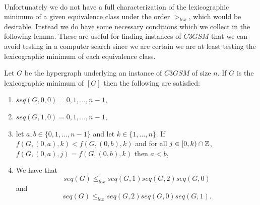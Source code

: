\paragraph{}
Unfortunately we do not have a full characterization of the lexicographic minimum of a given equivalence class under the order $>_{lex}$, which would be desirable. Instead we do have some necessary conditions which we collect in the following lemma. These are useful for finding instances of $C3GSM$ that we can avoid testing in a computer search since we are certain we are at least testing the lexicographic minimum of each equivalence class.
\begin{lemma}\label{lemma:nec-symmetry}
Let $G$ be the hypergraph underlying an instance of $C3GSM$ of size $n$. If $G$ is the lexicographic minimum of $[G]$ then the following are satisfied:
\begin{enumerate}
\item $seq(G,0,0) = 0,1,\dots,n-1$,
\item $seq(G,1,0) = 0,1,\dots,n-1$,
\item let $a, b \in \{0,1,\dots, n-1\}$ and let $k \in \{1,\dots,n\}$. If $f(G,(0,a), k) < f(G,(0,b), k)$ and for all $j \in [0,k) \cap \mathbb{Z}$, $f(G,(0,a),j) =f(G,(0,b),k)$ then $a < b$,
\item We have that $$seq(G) \leq_{lex} seq(G,1)seq(G,2)seq(G,0)$$ and $$seq(G) \leq_{lex} seq(G,2)seq(G,0)seq(G,1).$$
\end{enumerate}
\end{lemma}
